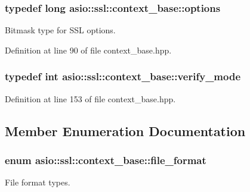 \subsubsection[{options}]{\setlength{\rightskip}{0pt plus 5cm}typedef long {\bf asio\+::ssl\+::context\+\_\+base\+::options}}\label{classasio_1_1ssl_1_1context__base_a12d5d28abeb47c91311bf13740dec514}


Bitmask type for S\+S\+L options. 



Definition at line 90 of file context\+\_\+base.\+hpp.

\hypertarget{classasio_1_1ssl_1_1context__base_aa9ef38ba747dd4e8ecb1f9a279a67d6b}{}
\subsubsection[{verify\+\_\+mode}]{\setlength{\rightskip}{0pt plus 5cm}typedef int {\bf asio\+::ssl\+::context\+\_\+base\+::verify\+\_\+mode}}\label{classasio_1_1ssl_1_1context__base_aa9ef38ba747dd4e8ecb1f9a279a67d6b}


Definition at line 153 of file context\+\_\+base.\+hpp.



\subsection{Member Enumeration Documentation}
\hypertarget{classasio_1_1ssl_1_1context__base_acc846aa73fffcab1fecad36dcf2be1fb}{}
\subsubsection[{file\+\_\+format}]{\setlength{\rightskip}{0pt plus 5cm}enum {\bf asio\+::ssl\+::context\+\_\+base\+::file\+\_\+format}}\label{classasio_1_1ssl_1_1context__base_acc846aa73fffcab1fecad36dcf2be1fb}


File format types. 

